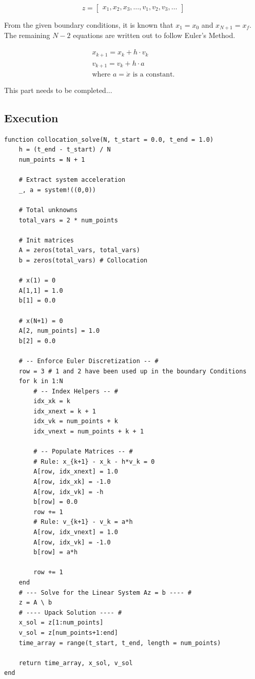 \documentclass{article}
\begin{document}
\begin{equation}
    z = 
    \begin{bmatrix}
    x_1, x_2, x_3, \dots , v_1, v_2, v_3, \dots    
    \end{bmatrix}
\end{equation}

From the given boundary conditions, it is known that $x_1 = x_0$ and $x_{N+1} = x_f$. The remaining $N-2$ equations are written out to follow Euler's Method.

\begin{eqnarray}
    x_{k+1} = x_k + h \cdot v_k \nonumber \\
    v_{k+1} = v_k + h \cdot a \nonumber \\ \text{where } a = \ddot{x} \text{ is a constant.}
\end{eqnarray}

This part needs to be completed...

\subsection{Execution}
\begin{verbatim}
function collocation_solve(N, t_start = 0.0, t_end = 1.0)
    h = (t_end - t_start) / N
    num_points = N + 1

    # Extract system acceleration
    _, a = system!((0,0))

    # Total unknowns
    total_vars = 2 * num_points

    # Init matrices
    A = zeros(total_vars, total_vars)
    b = zeros(total_vars) # Collocation

    # x(1) = 0
    A[1,1] = 1.0
    b[1] = 0.0

    # x(N+1) = 0
    A[2, num_points] = 1.0
    b[2] = 0.0

    # -- Enforce Euler Discretization -- #
    row = 3 # 1 and 2 have been used up in the boundary Conditions
    for k in 1:N
        # -- Index Helpers -- #
        idx_xk = k
        idx_xnext = k + 1
        idx_vk = num_points + k
        idx_vnext = num_points + k + 1

        # -- Populate Matrices -- #
        # Rule: x_{k+1} - x_k - h*v_k = 0
        A[row, idx_xnext] = 1.0
        A[row, idx_xk] = -1.0
        A[row, idx_vk] = -h
        b[row] = 0.0
        row += 1
        # Rule: v_{k+1} - v_k = a*h
        A[row, idx_vnext] = 1.0
        A[row, idx_vk] = -1.0
        b[row] = a*h

        row += 1
    end
    # --- Solve for the Linear System Az = b ---- #
    z = A \ b
    # ---- Upack Solution ---- #
    x_sol = z[1:num_points]
    v_sol = z[num_points+1:end]
    time_array = range(t_start, t_end, length = num_points)

    return time_array, x_sol, v_sol
end
\end{verbatim}
\end{document}
